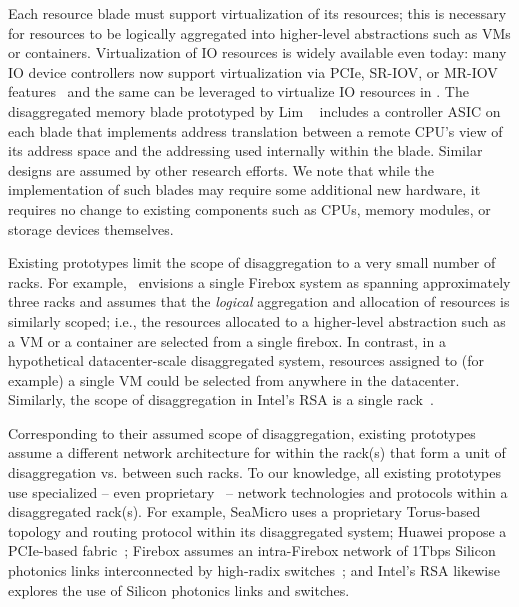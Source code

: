 Each resource blade must support virtualization of its resources; this is necessary for resources to be logically aggregated into higher-level abstractions such as VMs or containers.
Virtualization of IO resources is widely available even today: many IO device controllers now support virtualization via PCIe, SR-IOV, or MR-IOV features~\cite{sriov} and the same can be leveraged to virtualize IO resources in \dis.
The disaggregated memory blade prototyped by Lim \etal~\cite{ddcHwDesign1} includes a controller ASIC on each blade that implements address translation between a remote CPU's view of its address space and the addressing used internally within the blade. Similar designs are assumed by other research efforts. We note that while the implementation of such blades may require some additional new hardware, it requires no change to existing components such as CPUs, memory modules, or storage devices themselves.	
	
 Existing prototypes limit the scope of disaggregation to a very small number of racks. For example,~\cite{firebox} envisions a single Firebox system as spanning approximately three racks and assumes that the \emph{logical} aggregation and allocation of resources is similarly scoped; i.e., the resources allocated to a higher-level abstraction such as a VM or a container are selected from a single firebox. In contrast, in a hypothetical datacenter-scale disaggregated system, resources assigned to (for example) a single VM could be selected from anywhere in the datacenter. Similarly, the scope of disaggregation in Intel's RSA is a single rack~\cite{rsa}. 

Corresponding to their assumed scope of disaggregation, existing prototypes assume a different network architecture for within the rack(s) that form a unit of disaggregation vs. between such racks. To our knowledge, all existing \dis prototypes use specialized -- even proprietary~\cite{seamicro,huawei,rsa} -- network technologies and protocols within a disaggregated rack(s). For example, SeaMicro uses a proprietary Torus-based topology and routing protocol within its disaggregated system; Huawei propose a PCIe-based fabric~\cite{huawei1}; Firebox assumes an intra-Firebox network of 1Tbps Silicon photonics links interconnected by high-radix switches~\cite{firebox,vladimir}; and Intel's RSA likewise explores the use of Silicon photonics links and switches. 

